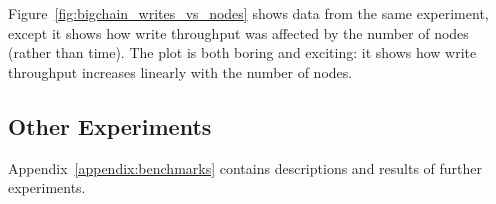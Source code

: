 Figure~\ref{fig:bigchain_writes_vs_nodes} shows data from the same experiment, except it shows how write throughput was affected by the number of nodes (rather than time).
The plot is both boring and exciting: it shows how write throughput increases linearly with the number of nodes.

\subsection{Other Experiments}
Appendix~\ref{appendix:benchmarks} contains descriptions and results of further experiments.